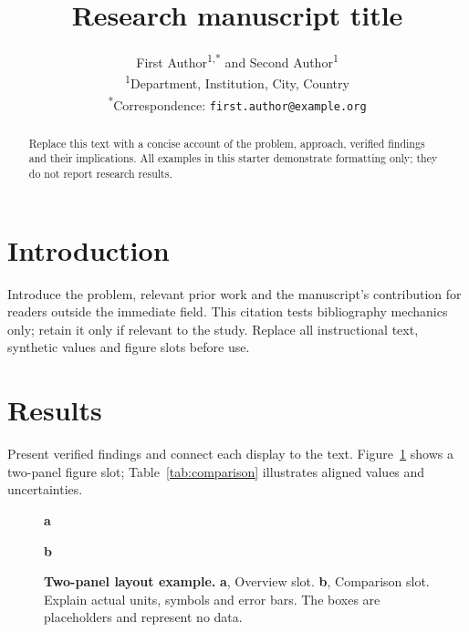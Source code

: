 \documentclass[11pt]{article}
\title{Research manuscript title}
\author{First Author\textsuperscript{1,*} and Second Author\textsuperscript{1}\\
  \small \textsuperscript{1}Department, Institution, City, Country\\
  \small \textsuperscript{*}Correspondence: \texttt{first.author@example.org}}
\date{}
\begin{document}
\maketitle
\begin{abstract}
Replace this text with a concise account of the problem, approach, verified
findings and their implications. All examples in this starter demonstrate
formatting only; they do not report research results.
\end{abstract}

\section{Introduction}\label{sec:introduction}
Introduce the problem, relevant prior work and the manuscript's contribution
for readers outside the immediate field. This citation tests bibliography
mechanics only; retain it only if relevant to the study\cite{wilkinson2016fair}.
Replace all instructional text, synthetic values and figure slots before use.

\section{Results}\label{sec:results}
Present verified findings and connect each display to the text.
Figure~\ref{fig:comparison} shows a two-panel figure slot; Table~\ref{tab:comparison}
illustrates aligned values and uncertainties.
\begin{figure}[htbp]
\centering
\begin{minipage}[t]{0.47\linewidth}
\centering\textbf{a}\par\smallskip
{}
\end{minipage}\hfill
\begin{minipage}[t]{0.47\linewidth}
\centering\textbf{b}\par\smallskip
{}
\end{minipage}
\caption{\textbf{Two-panel layout example.} \textbf{a}, Overview slot.
\textbf{b}, Comparison slot. Explain actual units, symbols and error bars.
The boxes are placeholders and represent no data.}
\label{fig:comparison}
\end{figure}
\end{document}
